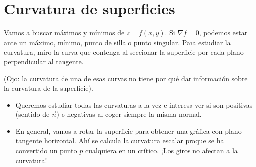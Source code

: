 \section{Curvatura de superficies}

Vamos a buscar máximos y mínimos de $z = f(x,y)$. Si $\nabla f = 0$, podemos estar ante un máximo, mínimo, punto de silla o punto singular. Para estudiar la curvatura, miro la curva que contenga al seccionar la superficie por cada plano perpendicular al tangente.

(Ojo: la curvatura de una de esas curvas no tiene por qué dar información sobre la curvatura de la superficie).

\begin{itemize}
	\item Queremos estudiar todas las curvaturas a la vez e interesa ver si son positivas (sentido de $\vec{n}$) o negativas al coger siempre la misma normal.
	\item En general, vamos a rotar la superficie para obtener una gráfica con plano tangente horizontal. Ahí se calcula la curvatura escalar proque se ha convertido un punto $p$ cualquiera en un crítico. ¡Los giros no afectan a la curvatura!
\end{itemize}